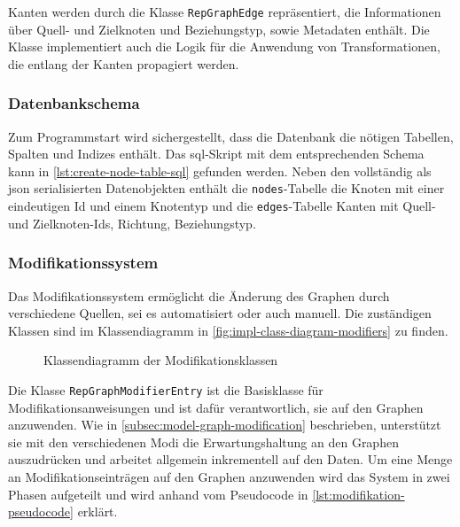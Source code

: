 Kanten werden durch die Klasse \texttt{RepGraphEdge} repräsentiert, die Informationen über Quell- und Zielknoten und Beziehungstyp, sowie Metadaten enthält.
Die Klasse implementiert auch die Logik für die Anwendung von Transformationen, die entlang der Kanten propagiert werden.


\subsubsection{Datenbankschema}

Zum Programmstart wird sichergestellt, dass die Datenbank die nötigen Tabellen, Spalten und Indizes enthält.
Das \acrshort{sql}-Skript mit dem entsprechenden Schema kann in \autoref{lst:create-node-table-sql} gefunden werden.
Neben den vollständig als \acrshort{json} serialisierten Datenobjekten enthält die \texttt{nodes}-Tabelle die Knoten mit einer eindeutigen Id und einem Knotentyp und die \texttt{edges}-Tabelle Kanten mit Quell- und Zielknoten-Ids, Richtung, Beziehungstyp.



\subsubsection{Modifikationssystem}

Das Modifikationssystem ermöglicht die Änderung des Graphen durch verschiedene Quellen, sei es automatisiert oder auch manuell.
Die zuständigen Klassen sind im Klassendiagramm in \autoref{fig:impl-class-diagram-modifiers} zu finden.

\begin{figure}[htbp]
    \centering
    \makebox[\textwidth]{}
    \caption{Klassendiagramm der Modifikationsklassen}
    \label{fig:impl-class-diagram-modifiers}
\end{figure}

Die Klasse \texttt{RepGraphModifierEntry} ist die Basisklasse für Modifikationsanweisungen und ist dafür verantwortlich, sie auf den Graphen anzuwenden.
Wie in \autoref{subsec:model-graph-modification} beschrieben, unterstützt sie mit den verschiedenen Modi die Erwartungshaltung an den Graphen auszudrücken und arbeitet allgemein inkrementell auf den Daten.
Um eine Menge an Modifikationseinträgen auf den Graphen anzuwenden wird das System in zwei Phasen aufgeteilt und wird anhand vom Pseudocode in \autoref{lst:modifikation-pseudocode} erklärt.

